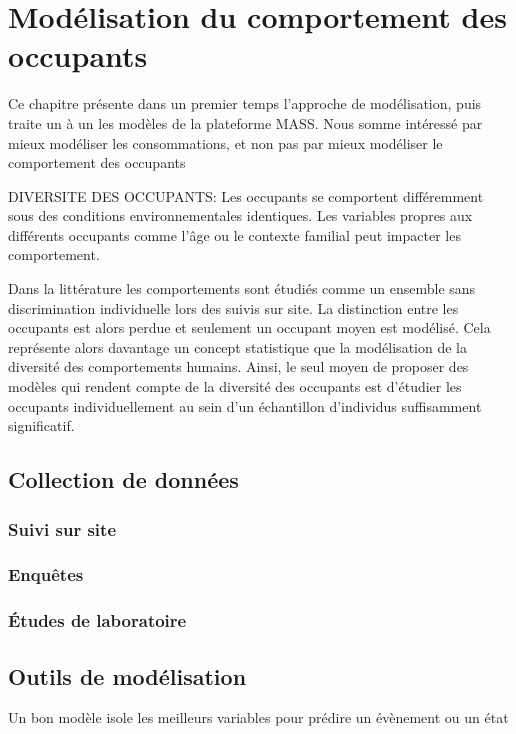 \chapter{Modélisation du comportement des occupants}

Ce chapitre présente dans un premier temps l'approche de modélisation, puis traite un à un les modèles de la plateforme MASS.
Nous somme intéressé par mieux modéliser les consommations, et non pas par mieux modéliser le comportement des occupants

DIVERSITE DES OCCUPANTS: Les occupants se comportent différemment sous des conditions environnementales identiques. Les variables propres aux différents occupants comme l'âge ou le contexte familial peut impacter les comportement.

Dans la littérature les comportements sont étudiés comme un ensemble sans discrimination individuelle lors des suivis sur site. La distinction entre les occupants est alors perdue et seulement un occupant moyen est modélisé. Cela représente alors davantage un concept statistique que la modélisation de la diversité des comportements humains. Ainsi, le seul moyen de proposer des modèles qui rendent compte de la diversité des occupants est d'étudier les occupants individuellement au sein d'un échantillon d'individus suffisamment significatif.

\section{Collection de données}

\subsection{Suivi sur site}

\subsection{Enquêtes}

\subsection{Études de laboratoire}

\section{Outils de modélisation}

Un bon modèle isole les meilleurs variables pour prédire un évènement ou un état



